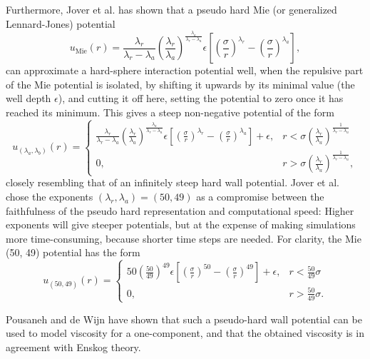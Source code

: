 Furthermore, Jover et al. \cite{ref:jover:pseudo_hard} has shown that a pseudo hard Mie (or generalized Lennard-Jones) potential
\begin{equation}
    u_{\text{Mie}}(r) = 
        \frac{\lambda_r}{\lambda_r - \lambda_a}
        \left(\frac{\lambda_r}{\lambda_a}\right)
        ^{\frac{\lambda_a}{\lambda_r - \lambda_a}}
        \epsilon \left[
            \left(\frac{\sigma}{r}\right)^{\lambda_r} -
            \left(\frac{\sigma}{r}\right)^{\lambda_a}
        \right],
\end{equation}
can approximate a hard-sphere interaction potential well, when the repulsive part of the Mie potential is isolated, by shifting it upwards by its minimal value (the well depth $\epsilon$), and cutting it off here, setting the potential to zero once it has reached its minimum.
This gives a steep non-negative potential of the form
\begin{equation}
    u_{(\lambda_a, \lambda_b)}(r) = 
    \begin{cases}
        \frac{\lambda_r}{\lambda_r - \lambda_a}
        \left(\frac{\lambda_r}{\lambda_a}\right)
        ^{\frac{\lambda_a}{\lambda_r - \lambda_a}}
        \epsilon \left[
            \left(\frac{\sigma}{r}\right)^{\lambda_r} -
            \left(\frac{\sigma}{r}\right)^{\lambda_a}
        \right]
        + \epsilon,
            & r < \sigma \left(
                \frac{\lambda_r}{\lambda_a}
            \right)^\frac{1}{\lambda_r - \lambda_a} \\
        0,  & r > \sigma \left(
                \frac{\lambda_r}{\lambda_a}
            \right)^\frac{1}{\lambda_r - \lambda_a},
    \end{cases}
\end{equation}
closely resembling that of an infinitely steep hard wall potential.
Jover et al. chose the exponents $(\lambda_r, \lambda_a) = (50, 49)$ as a compromise between the faithfulness of the pseudo hard representation and computational speed:
Higher exponents will give steeper potentials, but at the expense of making simulations more time-consuming, because shorter time steps are needed.
For clarity, the Mie (50, 49) potential has the form
\begin{equation}
    u_{(50, 49)}(r) = 
    \begin{cases}
        50
        \left(\frac{50}{49}\right)
        ^{49}
        \epsilon \left[
            \left(\frac{\sigma}{r}\right)^{50} -
            \left(\frac{\sigma}{r}\right)^{49}
        \right]
        + \epsilon,
            & r < \frac{50}{49} \sigma\\
        0,  & r > \frac{50}{49} \sigma.
    \end{cases}
\end{equation}

Pousaneh and de Wijn \cite{ref:pousaneh:shear_viscosity} have shown that such a pseudo-hard wall potential can be used to model viscosity for a one-component, and that the obtained viscosity is in agreement with Enskog theory.
